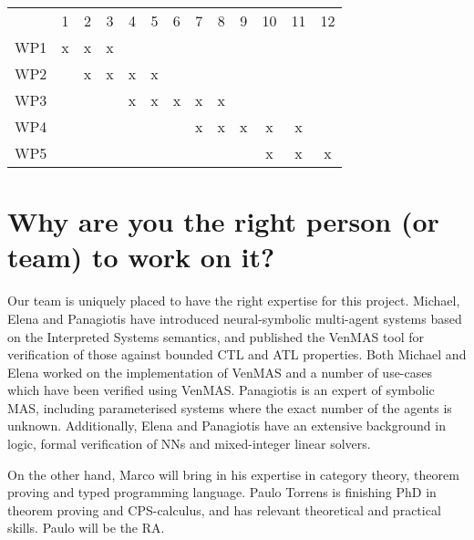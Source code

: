 \documentclass[11pt]{article}
\begin{document}
\begin{center}
  \begin{tabular}{ccccccccccccc}
    & 1 & 2 & 3& 4& 5 & 6 &7 &8& 9&10&11&12\\
    WP1& x & x & x \\
    WP2&   & x & x & x & x &   & \\
    WP3&   &   &   & x & x & x & x & x & \\
    WP4&   &   &   &   &   &   & x & x & x & x & x &   \\
    WP5&   &   &   &   &   &   &   &   &   & x & x & x \\
  \end{tabular}
\end{center}

\section{Why are you the right person (or
team) to work on it?}


Our team is uniquely placed to have the right expertise for this
project. Michael, Elena and Panagiotis have introduced neural-symbolic
multi-agent systems based on the Interpreted Systems semantics, and
published the VenMAS tool for verification of those against bounded
CTL and ATL properties.  Both Michael and Elena worked on the
implementation of VenMAS and a number of use-cases which have been
verified using VenMAS.  Panagiotis is an expert of symbolic MAS,
including parameterised systems where the exact number of the agents
is unknown.  Additionally, Elena and Panagiotis have an extensive
background in logic, formal verification of NNs and mixed-integer
linear solvers.

On the other hand, Marco will bring in his expertise in category
theory, theorem proving and typed programming language.  Paulo Torrens
is finishing PhD in theorem proving and CPS-calculus, and has relevant
theoretical and practical skills. Paulo will be the RA.

 



\end{document}
